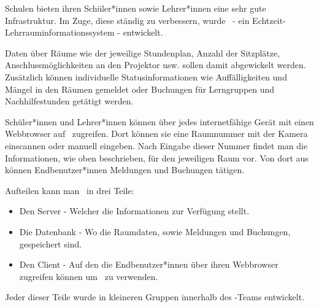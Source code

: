 
Schulen bieten ihren Schüler*innen sowie Lehrer*innen eine sehr gute Infrastruktur. Im Zuge, diese ständig zu verbessern, wurde \ZELIA\ - ein Echtzeit-Lehr\-raum\-informations\-system - entwickelt. 

Daten über Räume wie der jeweilige Stundenplan, Anzahl der Sitzplätze, Anschlussmöglichkeiten an den Projektor usw. sollen damit abgewickelt werden. Zusätzlich können individuelle Statusinformationen wie Auffälligkeiten und Mängel in den Räumen gemeldet oder Buchungen für Lerngruppen und Nachhilfestunden getätigt werden.

Schüler*innen und Lehrer*innen können über jedes internetfähige Gerät mit einen Webbrowser auf \ZELIA\ zugreifen. Dort können sie eine Raumnummer mit der Kamera einscannen oder manuell eingeben. Nach Eingabe dieser Nummer findet man die Informationen, wie oben beschrieben, für den jeweiligen Raum vor. Von dort aus können Endbenutzer*innen Meldungen und Buchungen tätigen.

Aufteilen kann man \ZELIA\ in drei Teile:
\begin{itemize}
    \item Den Server - Welcher die Informationen zur Verfügung stellt.
    \item Die Datenbank - Wo die Raumdaten, sowie Meldungen und Buchungen, gespeichert sind.
    \item Den Client - Auf den die Endbenutzer*innen über ihren Webbrowser zugreifen können um \ZELIA\ zu verwenden.
\end{itemize}

Jeder dieser Teile wurde in kleineren Gruppen innerhalb des \ZELIA-Teams entwickelt.

